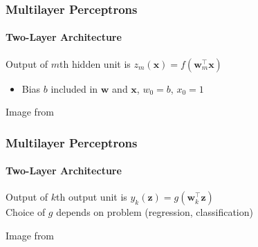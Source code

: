 \documentclass[xetex,professionalfont]{beamer}
\renewcommand{\vec}[1]{\ensuremath{\mathbf{#1}}}
\newcommand{\vw}{\vec{w}}
\newcommand{\vx}{\vec{x}}
\newcommand{\vz}{\vec{z}}
\begin{document}

\begin{frame}
\frametitle{Multilayer Perceptrons}
\framesubtitle{Two-Layer Architecture}

Output of $m$th hidden unit is $z_m(\vx)=f(\vw_m^\top\vx)$
\begin{itemize}
	\item Bias $b$ included in $\vw$ and $\vx$, $w_0=b$, $x_0=1$
\end{itemize}

\bigskip
\begin{center}
	{\centering Image from \cite{bishop2006}}
\end{center}

\end{frame}


\begin{frame}
\frametitle{Multilayer Perceptrons}
\framesubtitle{Two-Layer Architecture}

Output of $k$th output unit is $y_k(\vz)=g(\vw_k^\top\vz)$\\\medskip %
Choice of $g$ depends on problem (regression, classification) %

\bigskip
\begin{center}
	{\centering Image from \cite{bishop2006}}
\end{center}

\end{frame}
\end{document}
